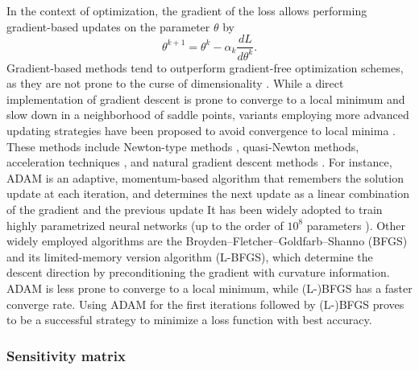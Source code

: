 In the context of optimization, the gradient of the loss allows performing gradient-based updates on the parameter $\theta$ by 
\begin{equation}
    \theta^{k+1} 
    = 
    \theta^k 
    - 
    \alpha_k 
    \frac{dL}{d\theta^k}.
\end{equation}
Gradient-based methods tend to outperform gradient-free optimization schemes, as they are not prone to the curse of dimensionality \cite{Schartau2017}. 
While a direct implementation of gradient descent is prone to converge to a local minimum and slow down in a neighborhood of saddle points, variants employing more advanced updating strategies have been proposed to avoid convergence to local minima \cite{ruder2016overview-gradient-descent}.
These methods include Newton-type methods \cite{second-order-optimization}, quasi-Newton methods, acceleration techniques \cite{JMLR:v22:20-207}, and natural gradient descent methods \cite{doi:10.1137/22M1477805}. 
For instance, ADAM is an adaptive, momentum-based algorithm  that remembers the solution update at each iteration, and determines the next update as a linear combination of the gradient and the previous update \cite{Kingma2014}
It has been widely adopted to train highly parametrized neural networks (up to the order of $10^8$ parameters \cite{NIPS2017_3f5ee243}).
Other widely employed algorithms are the Broyden–Fletcher–Goldfarb–Shanno (BFGS) and its limited-memory version algorithm (L-BFGS), which determine the descent direction by preconditioning the gradient with curvature information. 
ADAM is less prone to converge to a local minimum, while (L-)BFGS has a faster converge rate. 
Using ADAM for the first iterations followed by (L-)BFGS proves to be a successful strategy to minimize a loss function with best accuracy. 

% 

\subsubsection{Sensitivity matrix}

